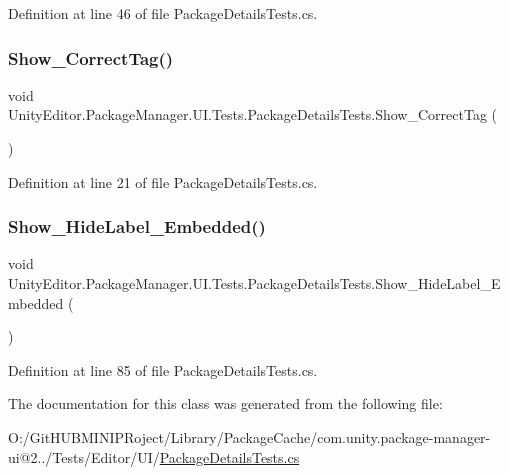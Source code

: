 Definition at line 46 of file Package\+Details\+Tests.\+cs.

\mbox{\label{class_unity_editor_1_1_package_manager_1_1_u_i_1_1_tests_1_1_package_details_tests_a596c8c89e303ba583b51c1dbd53ef9cd}} 
\subsubsection{\texorpdfstring{Show\_CorrectTag()}{Show\_CorrectTag()}}
{\footnotesize\ttfamily void Unity\+Editor.\+Package\+Manager.\+U\+I.\+Tests.\+Package\+Details\+Tests.\+Show\+\_\+\+Correct\+Tag (\begin{DoxyParamCaption}{ }\end{DoxyParamCaption})}



Definition at line 21 of file Package\+Details\+Tests.\+cs.

\mbox{\label{class_unity_editor_1_1_package_manager_1_1_u_i_1_1_tests_1_1_package_details_tests_afc925f444710c88e642b906ed82e0363}} 
\subsubsection{\texorpdfstring{Show\_HideLabel\_Embedded()}{Show\_HideLabel\_Embedded()}}
{\footnotesize\ttfamily void Unity\+Editor.\+Package\+Manager.\+U\+I.\+Tests.\+Package\+Details\+Tests.\+Show\+\_\+\+Hide\+Label\+\_\+\+Embedded (\begin{DoxyParamCaption}{ }\end{DoxyParamCaption})}



Definition at line 85 of file Package\+Details\+Tests.\+cs.



The documentation for this class was generated from the following file\+:\begin{DoxyCompactItemize}
\item 
O\+:/\+Git\+H\+U\+B\+M\+I\+N\+I\+P\+Roject/\+Library/\+Package\+Cache/com.\+unity.\+package-\/manager-\/ui@2../\+Tests/\+Editor/\+U\+I/\mbox{\hyperlink{_package_details_tests_8cs}{Package\+Details\+Tests.\+cs}}\end{DoxyCompactItemize}
